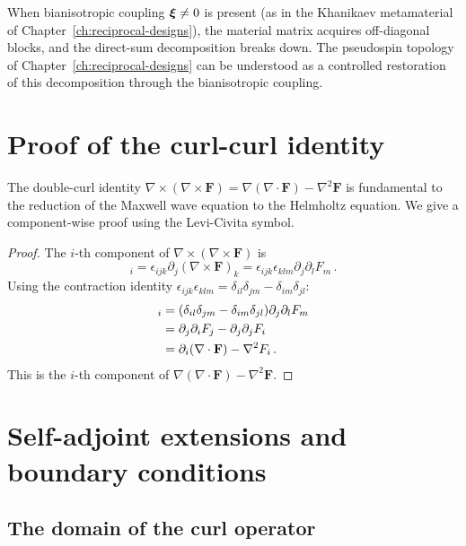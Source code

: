 When bianisotropic coupling $\boldsymbol{\xi}\neq 0$ is present (as in the
Khanikaev metamaterial of Chapter~\ref{ch:reciprocal-designs}), the
material matrix acquires off-diagonal blocks, and the direct-sum
decomposition breaks down.  The pseudospin topology of
Chapter~\ref{ch:reciprocal-designs} can be understood as a controlled
restoration of this decomposition through the bianisotropic coupling.

\section{Proof of the curl-curl identity}
\label{sec:appA-curl-curl-proof}

The double-curl identity $\nabla\times(\nabla\times\mathbf{F})
=\nabla(\nabla\cdot\mathbf{F})-\nabla^2\mathbf{F}$ is fundamental to
the reduction of the Maxwell wave equation to the Helmholtz equation.
We give a component-wise proof using the Levi-Civita symbol.

\begin{proof}
The $i$-th component of $\nabla\times(\nabla\times\mathbf{F})$ is
\begin{equation}
  [\nabla\times(\nabla\times\mathbf{F})]_i
  = \epsilon_{ijk}\partial_j(\nabla\times\mathbf{F})_k
  = \epsilon_{ijk}\epsilon_{klm}\partial_j\partial_l F_m\,.
\end{equation}
Using the contraction identity $\epsilon_{ijk}\epsilon_{klm}
=\delta_{il}\delta_{jm}-\delta_{im}\delta_{jl}$:
\begin{align}
  [\nabla\times(\nabla\times\mathbf{F})]_i
  &= (\delta_{il}\delta_{jm}-\delta_{im}\delta_{jl})
  \partial_j\partial_l F_m \notag\\
  &= \partial_j\partial_i F_j - \partial_j\partial_j F_i \notag\\
  &= \partial_i(\nabla\cdot\mathbf{F}) - \nabla^2 F_i\,.
\end{align}
This is the $i$-th component of
$\nabla(\nabla\cdot\mathbf{F})-\nabla^2\mathbf{F}$.
\end{proof}

\section{Self-adjoint extensions and boundary conditions}
\label{sec:appA-selfadjoint}

\subsection{The domain of the curl operator}
\label{sec:appA-curl-domain}


